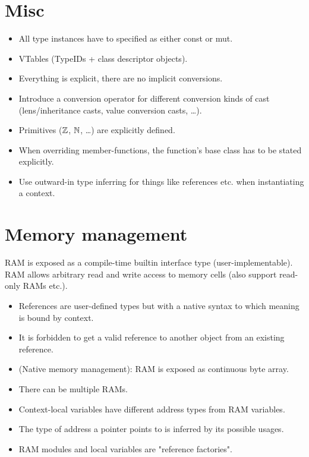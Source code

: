 \section{Misc}
\begin{itemize}
	\item All type instances have to specified as either const or mut.
	\item VTables (TypeIDs + class descriptor objects).
	\item Everything is explicit, there are no implicit conversions.
	\item Introduce a conversion operator for different conversion kinds of cast (lens/inheritance casts, value conversion casts, \dots).
	\item Primitives ($\mathbb{Z}$, $\mathbb{N}$, \dots) are explicitly defined.
	\item When overriding member-functions, the function's base class has to be stated explicitly.
	\item Use outward-in type inferring for things like references etc. when instantiating a context.
\end{itemize}


\section{Memory management}
RAM is exposed as a compile-time builtin interface type (user-implementable).
RAM allows arbitrary read and write access to memory cells (also support read-only RAMs etc.).
\begin{itemize}
	\item References are user-defined types but with a native syntax to which meaning is bound by context.
	\item It is forbidden to get a valid reference to another object from an existing reference.
	\item (Native memory management): RAM is exposed as continuous byte array.
	\item There can be multiple RAMs.
	\item Context-local variables have different address types from RAM variables.
	\item The type of address a pointer points to is inferred by its possible usages.
	\item RAM modules and local variables are "reference factories".
\end{itemize}
